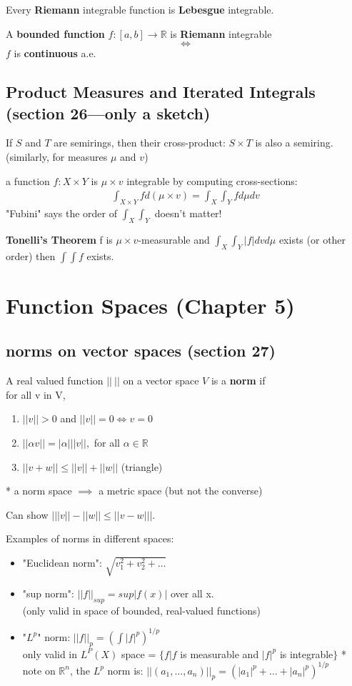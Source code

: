 \documentclass[a4paper, 12pt]{article}
\def\R{\ensuremath{\mathbb{R}}} %
\newcommand{\abs}[1]{\left\vert#1\right\vert} %
\newcommand{\bt}[1]{\textbf{#1}} %
\newcommand{\eq}[1]{\begin{align*}#1\end{align*}} %
\renewcommand{\eq}[1]{\begin{align*}#1\end{align*}} %
\newcommand{\gray}[1]{{\leavevmode\color[gray]{0.5}{#1}}} %
\begin{document}
\begin{multicols}{2}
Every \bt{Riemann} integrable function is \bt{Lebesgue} integrable.

A \bt{bounded function} $f: [a, b] \rightarrow \R$ is \bt{Riemann} integrable 
$$\iff$$
$f$ is \bt{continuous} a.e.

\subsection{Product Measures and Iterated Integrals (section 26---only a sketch)}

If $S$ and $T$ are semirings, then their cross-product: $S \times T$ is also a semiring.\\
(similarly, for measures $\mu$ and $v$)

a function $f: X \times Y$ is $\mu \times v$ integrable by computing cross-sections: 
\eq{
\int_{X \times Y} f d (\mu \times v) = \int_X \int_Y f d \mu d v
}
"Fubini" says the order of $\int_X \int_Y$ doesn't matter!

\bt{Tonelli's Theorem} f is $\mu \times v$-measurable and $\int_X \int_Y |f| d v d \mu$ exists (or other order) then $\int \int f$ exists.

\section{Function Spaces (Chapter 5)}

\subsection{norms on vector spaces (section 27)}
A real valued function $||\ ||$ on a vector space $V$ is a \bt{norm} if \\
for all v in V, 
\begin{enumerate}
    \item $||v|| > 0$ and $||v|| = 0 \iff v =0$
    \item $||\alpha v|| = |\alpha| ||v||,$ for all $\alpha \in \R$
    \item $||v + w || \leq ||v|| + ||w||$ (triangle)
\end{enumerate}


* a norm space $\implies$ a metric space (but not the converse)

Can show $\abs{||v|| - ||w|| \leq ||v - w||}$.
\gray{by triangle}

Examples of norms in different spaces: 

\begin{itemize}
    \item "Euclidean norm": $\sqrt{v_1^2 + v_2^2 + \dots}$ 
    \item "sup norm": $||f||_{sup} = sup |f(x)|$ over all x. \\
        (only valid in space of bounded, real-valued functions) 
    \item "$L^p$" norm: $||f||_p = \left(\int |f|^p \right )^{1/p}$ \\
        only valid in $L^P(X)$ space = $\{ f | f$ is measurable and $|f|^p$ is integrable$\}$
        * note on $\R^n$, the $L^p$ norm is: 
        $||(a_1, \dots, a_n)||_p = (|a_1|^p + \dots + |a_n|^p)^{1/p}$
\end{itemize}


\end{multicols}
\end{document}
